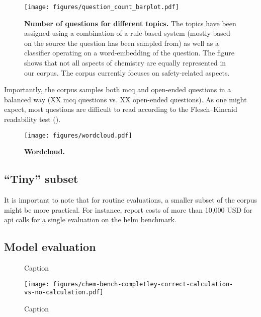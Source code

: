 \documentclass[11pt, oneside]{article}
\begin{document}
\begin{figure}
    \centering
    \texttt{[image: figures/question\_count\_barplot.pdf]}
    \caption{\textbf{Number of questions for different topics.} The topics have been assigned using a combination of a rule-based system (mostly based on the source the question has been sampled from) as well as a classifier operating on a word-embedding of the question. The figure shows that not all aspects of chemistry are equally represented in our corpus. The corpus currently focuses on safety-related aspects.}
    \label{fig:topic_barplot}
\end{figure}

Importantly, the corpus samples both \gls{mcq} and open-ended questions in a balanced way (XX \gls{mcq} questions vs. XX open-ended questions). 
As one might expect, most questions are difficult to read according to the Flesch–Kincaid readability test (). \cite{kincaid1975derivation}


\begin{figure}
    \centering 
    \texttt{[image: figures/wordcloud.pdf]}
    \caption{\textbf{Wordcloud.}}
    \label{fig:wordcloud}
\end{figure}


\subsection{\enquote{Tiny} subset}
It is important to note that for routine evaluations, a smaller subset of the  corpus might be more practical.\cite{polo2024tinybenchmarks}
For instance, \citet{liang2023holistic} report costs of more than 10,000 USD for \gls{api} calls for a single evaluation on the \gls{helm} benchmark.


\subsection{Model evaluation}


\begin{figure}
    \centering
    \caption{Caption}
    \label{fig:enter-label}
\end{figure}


\begin{figure}
    \centering
    \texttt{[image: figures/chem-bench-completley-correct-calculation-vs-no-calculation.pdf]}
    \caption{Caption}
    \label{fig:enter-label}
\end{figure}
\end{document}
